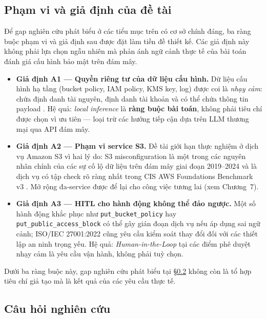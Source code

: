 \subsection{Phạm vi và giả định của đề tài}
\label{subsec:rw-scope}

Để gap nghiên cứu phát biểu ở các tiểu mục trên có cơ sở chính đáng, ba ràng buộc phạm vi và giả định sau được đặt làm tiền đề thiết kế. Các giả định này không phải lựa chọn ngẫu nhiên mà phản ánh ngữ cảnh thực tế của bài toán đánh giá cấu hình bảo mật trên đám mây.

\begin{itemize}
  \item \textbf{Giả định A1 --- Quyền riêng tư của dữ liệu cấu hình.} Dữ liệu cấu hình hạ tầng (bucket policy, IAM policy, KMS key, log) được coi là \textit{nhạy cảm}: chứa định danh tài nguyên, định danh tài khoản và có thể chứa thông tin payload \cite{verizon_dbir_2024,ibm_cost_breach_2024}. Hệ quả: \textit{local inference} là \textbf{ràng buộc bài toán}, không phải tiêu chí được chọn vì ưu tiên — loại trừ các hướng tiếp cận dựa trên LLM thương mại qua API đám mây.
  \item \textbf{Giả định A2 --- Phạm vi service S3.} Đề tài giới hạn thực nghiệm ở dịch vụ Amazon S3 vì hai lý do: S3 misconfiguration là một trong các nguyên nhân chính của các sự cố lộ dữ liệu trên đám mây giai đoạn 2019--2024 \cite{verizon_dbir_2024} và là dịch vụ có tập check rõ ràng nhất trong CIS AWS Foundations Benchmark v3 \cite{cis_aws_foundations}. Mở rộng đa-service được để lại cho công việc tương lai (xem Chương~7).
  \item \textbf{Giả định A3 --- HITL cho hành động không thể đảo ngược.} Một số hành động khắc phục như \texttt{put\_bucket\_policy} hay \texttt{put\_public\_access\_block} có thể gây gián đoạn dịch vụ nếu áp dụng sai ngữ cảnh; ISO/IEC 27001:2022 \cite{iso_27001_2022} cũng yêu cầu kiểm soát thay đổi đối với các thiết lập an ninh trọng yếu. Hệ quả: \textit{Human-in-the-Loop} tại các điểm phê duyệt nhạy cảm là yêu cầu vận hành, không phải tuỳ chọn.
\end{itemize}

Dưới ba ràng buộc này, gap nghiên cứu phát biểu tại §\ref{subsec:rw-rqs} không còn là tổ hợp tiêu chí giả tạo mà là kết quả của các yêu cầu thực tế.

\subsection{Câu hỏi nghiên cứu}
\label{subsec:rw-rqs}

